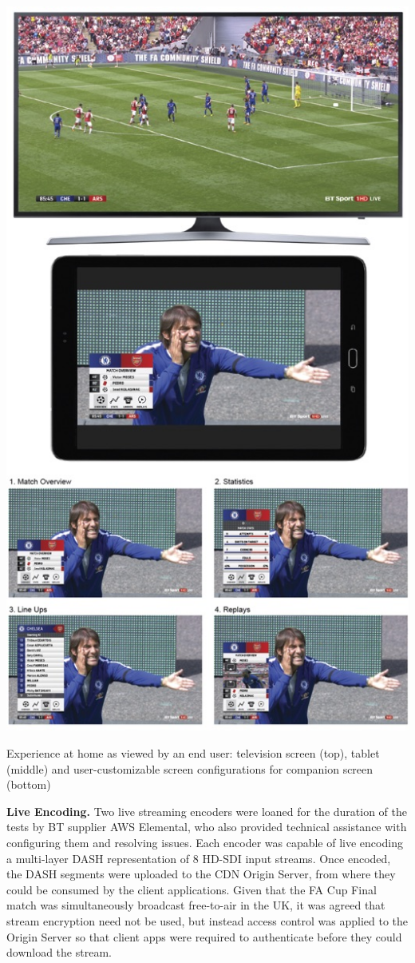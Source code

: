 \documentclass[sigchi-a, authorversion]{acmart}
\begin{document}
\begin{marginfigure}
    \includegraphics[width=\marginparwidth]{Figures/footballathome1.jpg}
    \caption{Experience at home as viewed by an end user: television screen (top), tablet (middle) and user-customizable screen configurations for companion screen (bottom)}
    \label{fig:homeexperience}
\end{marginfigure}

\vspace{5pt}\noindent\textbf{Live Encoding.} Two live streaming encoders were loaned for the duration
of the tests by BT supplier AWS Elemental, who also provided technical assistance
with configuring them and resolving issues. Each encoder was capable of live
encoding a multi-layer DASH representation of 8 HD-SDI input streams. Once
encoded, the DASH segments were uploaded to the CDN Origin Server, from where
they could be consumed by the client applications. Given that the FA Cup Final
match was simultaneously broadcast free-to-air in the UK, it was agreed that
stream encryption need not be used, but instead access control was applied to
the Origin Server so that client apps were required to authenticate before they
could download the stream.
\end{document}
